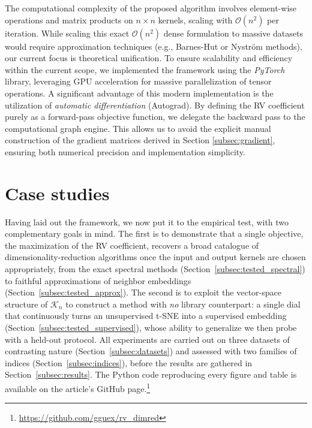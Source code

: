 \documentclass[11pt]{article}
\begin{document}
	The computational complexity of the proposed algorithm involves element-wise operations and matrix products on $n \times n$ kernels, scaling with $\mathcal{O}(n^2)$ per iteration. While scaling this exact $\mathcal{O}(n^2)$ dense formulation to massive datasets would require approximation techniques (e.g., Barnes-Hut or Nyström methods), our current focus is theoretical unification. To ensure scalability and efficiency within the current scope, we implemented the framework using the \textit{PyTorch} library, leveraging GPU acceleration for massive parallelization of tensor operations. A significant advantage of this modern implementation is the utilization of \textit{automatic differentiation} (Autograd). By defining the RV coefficient purely as a forward-pass objective function, we delegate the backward pass to the computational graph engine. This allows us to avoid the explicit manual construction of the gradient matrices derived in Section \ref{subsec:gradient}, ensuring both numerical precision and implementation simplicity.
	
	
	\section{Case studies}
	\label{section:case_studies}
	
	Having laid out the framework, we now put it to the empirical test, with two
	complementary goals in mind. The first is to demonstrate that a single objective,
	the maximization of the RV coefficient, recovers a broad catalogue of
	dimensionality-reduction algorithms once the input and output kernels are chosen
	appropriately, from the exact spectral methods (Section~\ref{subsec:tested_spectral})
	to faithful approximations of neighbor embeddings
	(Section~\ref{subsec:tested_approx}). The second is to exploit the vector-space
	structure of $\mathcal{K}_n$ to construct a method with \emph{no} library
	counterpart: a single dial that continuously turns an unsupervised t-SNE into a
	supervised embedding (Section~\ref{subsec:tested_supervised}), whose ability to
	generalize we then probe with a held-out protocol. All experiments are carried out
	on three datasets of contrasting nature (Section~\ref{subsec:datasets}) and assessed
	with two families of indices (Section~\ref{subsec:indices}), before the results are
	gathered in Section~\ref{subsec:results}. The Python code reproducing every figure
	and table is available on the article's GitHub
	page.\footnote{\url{https://github.com/gguex/rv_dimred}}
	
\end{document}
